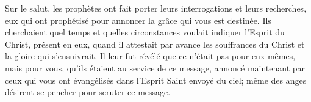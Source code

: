 Sur le salut,
		les prophètes ont fait porter leurs interrogations et leurs recherches,
	eux qui ont prophétisé pour annoncer la grâce qui vous est destinée.
Ils cherchaient quel temps et quelles circonstances
		voulait indiquer l’Esprit du Christ, présent en eux,
	quand il attestait par avance les souffrances du Christ
	et la gloire qui s’ensuivrait.
Il leur fut révélé que ce n’était pas pour eux-mêmes, mais pour vous,
	qu’ils étaient au service de ce message,
	annoncé maintenant par ceux qui vous ont évangélisés
		dans l’Esprit Saint envoyé du ciel;
	même des anges désirent se pencher pour scruter ce message.